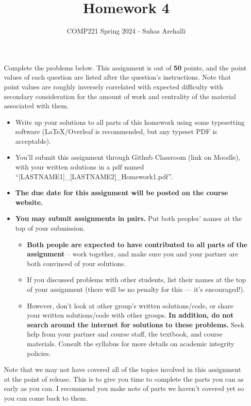 \documentclass{exam}
\title{Homework 4}
\author{COMP221 Spring 2024 - Suhas Arehalli}
\date{}
\begin{document}
\maketitle

Complete the problems below. This assignment is out of \textbf{50} points, and the point values of each question are listed after the question's instructions. Note that point values are roughly inversely correlated with expected difficulty with secondary consideration for the amount of work and centrality of the material associated with them.

\begin{itemize}
    \item Write up your solutions to all parts of this homework using some typesetting software (LaTeX/Overleaf is recommended, but any typeset PDF is acceptable).
    \item You'll submit this assignment through Github Classroom (link on Moodle), with your written solutions in a pdf named ``[LASTNAME1]\_[LASTNAME2]\_Homework1.pdf''.
    \item \textbf{The due date for this assignment will be posted on the course website.}
    \item \textbf{You may submit assignments in pairs.} Put both peoples' names at the top of your submission. \begin{itemize}
        \item \textbf{Both people are expected to have contributed to all parts of the assignment} -- work together, and make sure you and your partner are both convinced of your solutions.
        \item If you discussed problems with other students, list their names at the top of your assignment (there will be no penalty for this --- it's encouraged!).
        \item However, don't look at other group's written solutions/code, or share your written solutions/code with other groups. \textbf{In addition, do not search around the internet for solutions to these problems.} Seek help from your partner and course staff, the textbook, and course materials. Consult the syllabus for more details on academic integrity policies.
    \end{itemize}  
\end{itemize}   

Note that we may not have covered all of the topics involved in this assignment at the point of release. This is to give you time to complete the parts you can as early as you can. I recommend you make note of parts we haven't covered yet so you can come back to them.
\end{document}
